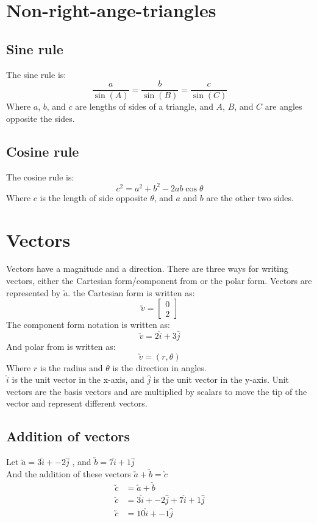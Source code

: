 \documentclass[a4paper,10pt]{report}
\begin{document}
\section{Non-right-ange-triangles}
\subsection{Sine rule}
The sine rule is:
$$
	\frac{a}{\sin(A)} = \frac{b}{\sin(B)} = \frac{c}{\sin(C)}
$$
Where $a$, $b$, and $c$ are lengths of sides of a triangle, and $A$, $B$, and $C$ are angles opposite the sides.

\subsection{Cosine rule}
The cosine rule is:
$$
	c^2 = a^2 + b^2 -2ab\cos\theta
$$
Where $c$ is the length of side opposite $\theta$, and $a$ and $b$ are the other two sides.


\section{Vectors}
Vectors have a magnitude and a direction.  There are three ways for writing vectors, either the Cartesian form/component from or the polar form.  Vectors are represented by $\utilde{a}$.  the Cartesian form is written as:
$$
	\utilde{v} = \begin{bmatrix}
		0 \\
		2
	\end{bmatrix}
$$
The component form notation is written as:
$$
	\utilde{v} = 2\hat{i} + 3\hat{j}
$$
And polar from is written as:
$$
	\utilde{v} = (r, \theta)
$$
Where $r$ is the radius and $\theta$ is the direction in angles.\\

$\hat{i}$ is the unit vector in the x-axis, and $\hat{j}$ is the unit vector in the y-axis.  Unit vectors are the basis vectors and are multiplied by scalars to move the tip of the vector and represent different vectors.

\subsection{Addition of vectors}
Let $\utilde{a} = 3\hat{i} + -2\hat{j}$ , and $\utilde{b} = 7\hat{i} + 1\hat{j}$\\
And the addition of these vectors $\utilde{a} + \utilde{b} = \utilde{c}$\\
\begin{align*}
	\utilde{c} & = \utilde{a} + \utilde{b}                    \\
	\utilde{c} & = 3\hat{i} + -2\hat{j} + 7\hat{i} + 1\hat{j} \\
	\utilde{c} & = 10\hat{i} + -1\hat{j}
\end{align*}
\end{document}
